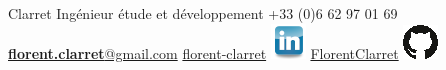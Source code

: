 \documentclass[]{friggeri-cv}
\begin{document}
				{ Clarret} 
				{Ingénieur étude et développement}
				{+33 (0)6 62 97 01 69}
				{\href{mailto:florent.clarret@gmail.com}{\textbf{florent.clarret}@gmail.com} }
				{\href{https://www.linkedin.com/in/florent-clarret/}{florent-clarret} \includegraphics{../img/linkedin.png}}
				{\href{https://github.com/FlorentClarret}{FlorentClarret} \includegraphics{../img/github.png}}
	
\end{document}
